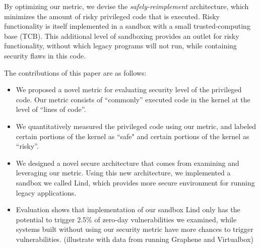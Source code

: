 By optimizing our metric, we devise the \emph{safely-reimplement}
architecture, which minimizes the amount of risky privileged code that is
executed.  
Risky functionality is itself implemented in a sandbox with
a small trusted-computing base (TCB). 
This additional level of sandboxing provides an outlet for risky functionality, without which
legacy programs will not run, while containing security flaws in this code. 

The contributions of this paper are as follows:
\begin{itemize}
\item We proposed a novel metric for evaluating security level of the privileged code. 
Our metric consists of ``commonly'' executed code in the kernel at the level of ``lines of code''. 

\item We quantitatively measured the privileged code using our metric, and labeled certain portions of 
the kernel as ``safe" and certain portions of the kernel as ``risky''.

\item We designed a novel secure architecture that comes from examining and leveraging our metric. 
Using this new architecture, we implemented a sandbox we called Lind, which provides more secure environment
for running legacy applications. 

\item Evaluation shows that implementation of our sandbox Lind only has the potential to trigger 2.5\% of zero-day 
vulnerabilities we examined, while systems built without using our security metric have more chances to trigger 
vulnerabilities. (illustrate with data from running Graphene and Virtualbox)
\end{itemize}